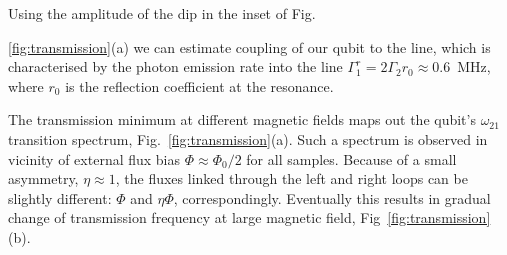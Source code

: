 \documentclass[%
reprint,
superscriptaddress,
bibnotes,
amsmath,
amssymb,
aps,
showkeys,
prb,
]{revtex4-1}
\begin{document}
Using the amplitude of the dip in the inset of Fig.~{\ref{fig:transmission}(a) we can estimate coupling of our qubit to the line\cite{Astafiev_2010,Peng_SPS}, which is characterised by the photon emission rate into the line $\Gamma_1^r =  2\Gamma_2 r_{0} \approx 0.6$~MHz, where $r_{0}$ is the reflection coefficient at the resonance.

The transmission minimum at different magnetic fields
maps   out   the   qubit's   $\omega_{21}$  transition   spectrum, Fig.~\ref{fig:transmission}(a).
Such a spectrum is observed in vicinity of external flux bias $\Phi \approx \Phi_0/2$ for all samples.
Because  of  a  small
asymmetry, $\eta\approx1$, the fluxes linked through  the left and right loops can be slightly
different: $ \Phi$ and $ \eta\Phi $, correspondingly. Eventually this results in gradual change of transmission frequency at large magnetic field, Fig~\ref{fig:transmission}(b).

}
\end{document}
